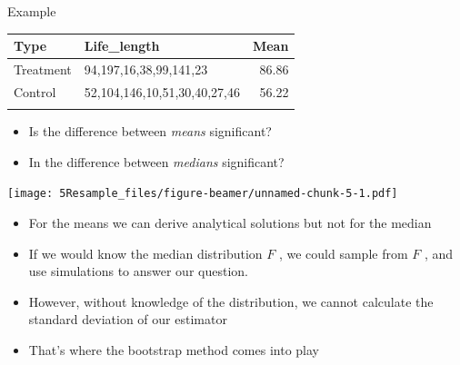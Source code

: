 \documentclass[
  10pt,
  ignorenonframetext,
]{beamer}
\begin{document}
\begin{frame}{Example}
\protect\hypertarget{example-1}{}
\begin{longtable}[]{@{}llr@{}}
\toprule\noalign{}
Type & Life\_length & Mean \\
\midrule\noalign{}
\endhead
Treatment & 94,197,16,38,99,141,23 & 86.86 \\
Control & 52,104,146,10,51,30,40,27,46 & 56.22 \\
\bottomrule\noalign{}
\end{longtable}

\begin{itemize}
\item
  Is the difference between \emph{means} significant?
\item
  In the difference between \emph{medians} significant?
\end{itemize}
\end{frame}

\begin{frame}
\texttt{[image: 5Resample\_files/figure-beamer/unnamed-chunk-5-1.pdf]}
\end{frame}

\begin{frame}
\begin{itemize}
\item
  For the means we can derive analytical solutions but not for the
  median
\item
  If we would know the median distribution \(F\) , we could sample from
  \(F\) , and use simulations to answer our question.
\item
  However, without knowledge of the distribution, we cannot calculate
  the standard deviation of our estimator
\item
  That's where the bootstrap method comes into play
\end{itemize}
\end{frame}
\end{document}
